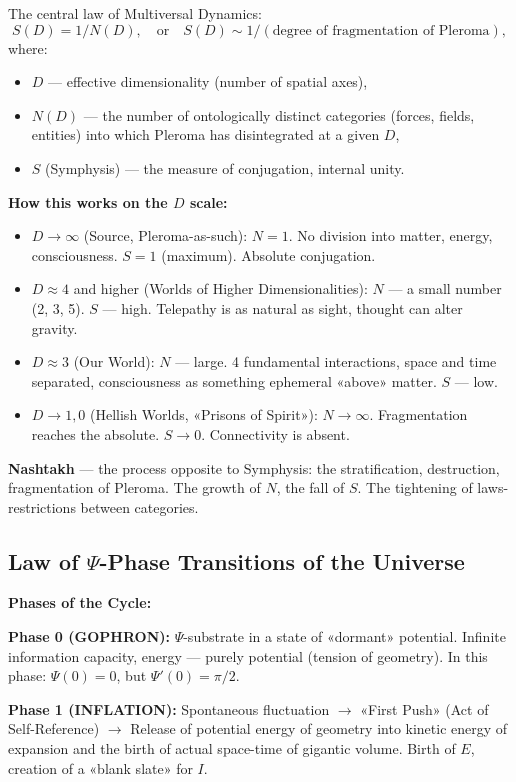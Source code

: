 \documentclass[a4paper,12pt]{article}
\begin{document}
	The central law of Multiversal Dynamics:
	\[
	S(D) = 1 / N(D), \quad \text{or} \quad S(D) \sim 1 / (\text{degree of fragmentation of Pleroma}),
	\]
	where:
	\begin{itemize}
		\item $D$ — effective dimensionality (number of spatial axes),
		\item $N(D)$ — the number of ontologically distinct categories (forces, fields, entities) into which Pleroma has disintegrated at a given $D$,
		\item $S$ (Symphysis) — the measure of conjugation, internal unity.
	\end{itemize}
	
	\textbf{How this works on the $D$ scale:}
	\begin{itemize}
		\item $D \to \infty$ (Source, Pleroma-as-such): $N = 1$. No division into matter, energy, consciousness. $S = 1$ (maximum). Absolute conjugation.
		\item $D \approx 4$ and higher (Worlds of Higher Dimensionalities): $N$ — a small number (2, 3, 5). $S$ — high. Telepathy is as natural as sight, thought can alter gravity.
		\item $D \approx 3$ (Our World): $N$ — large. 4 fundamental interactions, space and time separated, consciousness as something ephemeral «above» matter. $S$ — low.
		\item $D \to 1, 0$ (Hellish Worlds, «Prisons of Spirit»): $N \to \infty$. Fragmentation reaches the absolute. $S \to 0$. Connectivity is absent.
	\end{itemize}
	
	\textbf{Nashtakh} — the process opposite to Symphysis: the stratification, destruction, fragmentation of Pleroma. The growth of $N$, the fall of $S$. The tightening of laws-restrictions between categories.
	
	\subsection{Law of $\Psi$-Phase Transitions of the Universe}
	
	\textbf{Phases of the Cycle:}
	
	\textbf{Phase 0 (GOPHRON):} $\Psi$-substrate in a state of «dormant» potential. Infinite information capacity, energy — purely potential (tension of geometry). In this phase: $\Psi(0) = 0$, but $\Psi'(0) = \pi/2$.
	
	\textbf{Phase 1 (INFLATION):} Spontaneous fluctuation $\to$ «First Push» (Act of Self-Reference) $\to$ Release of potential energy of geometry into kinetic energy of expansion and the birth of actual space-time of gigantic volume. Birth of $E$, creation of a «blank slate» for $I$.
	
\end{document}
